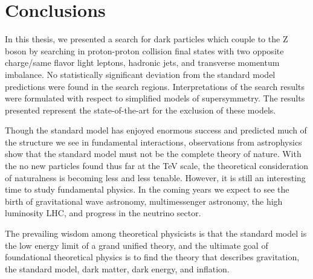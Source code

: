 \chapter{Conclusions}

In this thesis, we presented a search for dark particles which couple to the Z boson by searching in proton-proton collision final states with two opposite charge/same flavor light leptons, hadronic jets, and transverse momentum imbalance. No statistically significant deviation from the standard model predictions were found in the search regions. Interpretations of the search results were formulated with respect to simplified models of supersymmetry. The results presented represent the state-of-the-art for the exclusion of these models.

Though the standard model has enjoyed enormous success and predicted much of the structure we see in fundamental interactions, observations from astrophysics show that the standard model must not be the complete theory of nature. With the no new particles found thus far at the TeV scale, the theoretical consideration of naturalness is becoming less and less tenable. However, it is still an interesting time to study fundamental physics. In the coming years we expect to see the birth of gravitational wave astronomy, multimessenger astronomy, the high luminosity LHC, and progress in the neutrino sector. 

The prevailing wisdom among theoretical physicists is that the standard model is the low energy limit of a grand unified theory, and the ultimate goal of foundational theoretical physics is to find the theory that describes gravitation, the standard model, dark matter, dark energy, and inflation. 